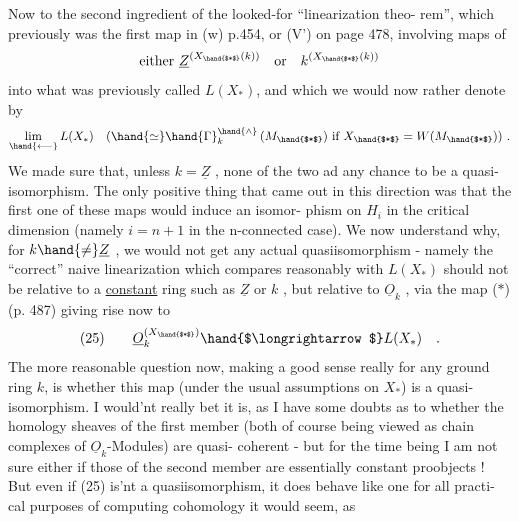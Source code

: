 Now to the second ingredient of the looked-for ``linearization theo-%
rem'', which previously was the first map in (w) p.454, or (V') on page
478, involving maps of 
\[ \text{either } \underline{Z}^{(X_{\hand{$*$}}(k))} \quad \text{or} \quad k^{(X_{\hand{$*$}}(k))} \]
into what was previously called $L(X_*)$, and which we  would now
rather denote by
\[ \underset{\hand{\longleftarrow}}{\lim}\, L(X_*) \quad ( \hand{\simeq} \hand{\Gamma}_k^{\hand{\wedge}}\,(M_{\hand{$*$}}) \ \text{if} \ X_{\hand{$*$}} = W(M_{\hand{$*$}}) ) \ . \]
We made sure that, unless $k=\underline{Z}$ , none of the two ad any chance to be
a quasi-isomorphism. The only positive thing that came out in this
direction was that the first one of these maps would induce an isomor-%
phism on $H_i$ in the critical dimension (namely $i=n+1$ in the n-connected
case). We now understand why,  for $k \hand{\neq} \underline{Z}$ , we would not get any
actual quasiisomorphism - namely the ``correct'' naive linearization
which compares reasonably with $L(X_*)$ should not be relative to a
\uline{constant} ring such as $\underline{Z}$ or $k$ , but relative to $\underline{O}_k$ , via the map
($*$) (p. 487) giving rise now to
\[ (25) \qquad \underline{O}_k^{(X_{\hand{$*$}})} \hand{$\longrightarrow$} L(X_*) \quad . \]
The more reasonable question now, making a good sense really for any
ground ring $k$, is whether this map (under the usual assumptions on $X_*$)
is a quasi-isomorphism. I would'nt really bet it is, as I have some
doubts as to whether the homology sheaves of the first member (both
 of course being viewed as chain complexes of $\underline{O}_k$-Modules) are quasi-%
coherent - but for the time being I am not sure either if those of
the second member are essentially constant proobjects ! But even if
(25) is'nt a quasiisomorphism, it does behave like one for all practi-%
cal purposes of computing cohomology\hand{,} it would seem, as 


